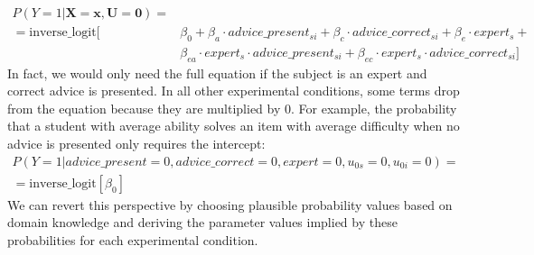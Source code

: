 \documentclass[
  man,
  floatsintext,
  longtable,
  a4paper,
  nolmodern,
  notxfonts,
  notimes,
  colorlinks=true,linkcolor=blue,citecolor=blue,urlcolor=blue]{apa7}
\begin{document}
\[
\begin{aligned}
P(Y=1|\mathbf{X=x}, \mathbf{U} = \mathbf{0}) = \\
= \text{inverse\_logit}[&\beta_0 + \beta_a \cdot advice\_present_{si} + \beta_c \cdot advice\_correct_{si} + \beta_e \cdot expert_s + \\
&\beta_{ea} \cdot expert_{s} \cdot advice\_present_{si} + \beta_{ec} \cdot expert_{s} \cdot advice\_correct_{si}]
\end{aligned}
\] In fact, we would only need the full equation if the subject is an
expert and correct advice is presented. In all other experimental
conditions, some terms drop from the equation because they are
multiplied by \(0\). For example, the probability that a student with
average ability solves an item with average difficulty when no advice is
presented only requires the intercept: \[
\begin{aligned}
P(Y=1| advice\_present = 0, advice\_correct = 0, expert = 0, u_{0s} = 0, u_{0i} = 0) = \\
= \text{inverse\_logit}[\beta_0]
\end{aligned}
\] We can revert this perspective by choosing plausible probability
values based on domain knowledge and deriving the parameter values
implied by these probabilities for each experimental condition.

\newpage
\end{document}
